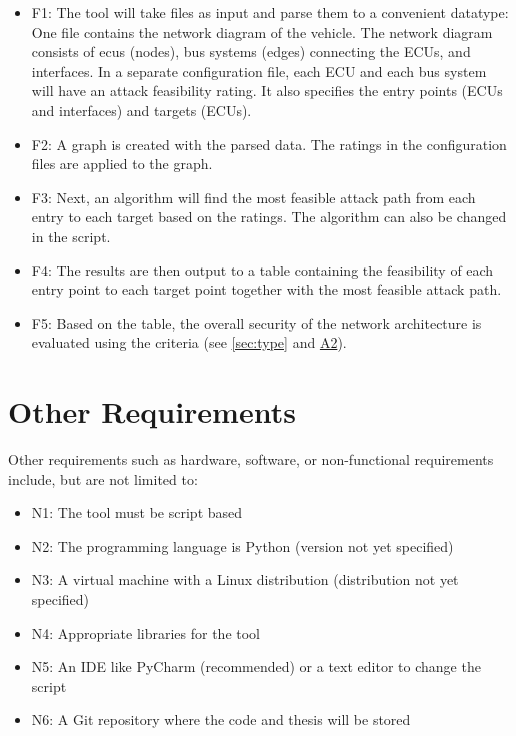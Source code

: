 \begin{itemize}

\item F1\label{sec:f1}: The tool will take files as input and parse them to a convenient datatype: 
One file contains the network diagram of the vehicle.
The network diagram consists of \gls{ecu}s (nodes), bus systems (edges) connecting the ECUs, and interfaces. 
In a separate configuration file, each ECU and each bus system will have an attack feasibility rating. 
It also specifies the entry points (ECUs and interfaces) and targets (ECUs).

\item F2\label{sec:f2}: A graph is created with the parsed data. The ratings in the configuration files are applied to the graph.

\item F3\label{sec:f3}: Next, an algorithm will find the most feasible attack path from each entry to each target based on the ratings. The algorithm can also be changed in the script. 

\item F4\label{sec:f4}: The results are then output to a table containing the feasibility of each entry point to each target point together with the most feasible attack path.

\item F5\label{sec:f5}: Based on the table, the overall security of the network architecture is evaluated using the criteria (see \ref{sec:type} and \hyperref[sec:a2]{A2}).

\end{itemize}

\section{Other Requirements}
\label{sec:hardware-software}

Other requirements such as hardware, software, or non-functional requirements include, but are not limited to:

\begin{itemize}
	\item N1\label{sec:n1}: The tool must be script based
	\item N2\label{sec:n2}: The programming language is Python (version not yet specified)
	\item N3\label{sec:n3}: A virtual machine with a Linux distribution (distribution not yet specified)
	\item N4\label{sec:n4}: Appropriate libraries for the tool
	\item N5\label{sec:n5}: An IDE like PyCharm (recommended) or a text editor to change the script
	\item N6\label{sec:n6}: A Git repository where the code and thesis will be stored
\end{itemize}
